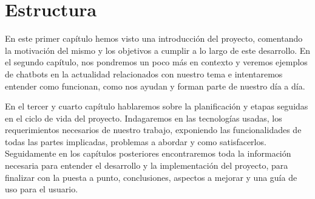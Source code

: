 \section{Estructura}

En este primer capítulo hemos visto una introducción del proyecto, comentando la motivación del mismo y los objetivos a cumplir a lo largo de este desarrollo. En el segundo capítulo, nos pondremos un poco más en contexto y veremos ejemplos de chatbots en la actualidad relacionados con nuestro tema e intentaremos entender como funcionan, como nos ayudan y forman parte de nuestro día a día.

En el tercer y cuarto capítulo hablaremos sobre la planificación y etapas seguidas en el ciclo de vida del proyecto. Indagaremos en las tecnologías usadas, los requerimientos necesarios de nuestro trabajo, exponiendo las funcionalidades de todas las partes implicadas, problemas a abordar y como satisfacerlos. Seguidamente en los capítulos posteriores encontraremos toda la información necesaria para entender el desarrollo y la implementación del proyecto, para finalizar con la puesta a punto, conclusiones, aspectos a mejorar y una guía de uso para el usuario. 